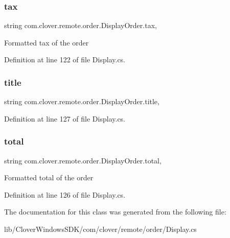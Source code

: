 \subsubsection{\texorpdfstring{tax}{tax}}
{\footnotesize\ttfamily string com.\+clover.\+remote.\+order.\+Display\+Order.\+tax\hspace{0.3cm}{\ttfamily [get]}, {\ttfamily [set]}}

Formatted tax of the order 

Definition at line 122 of file Display.\+cs.

\mbox{\label{classcom_1_1clover_1_1remote_1_1order_1_1_display_order_a05ed411a5be3726312a45e600af9d409}} 
\subsubsection{\texorpdfstring{title}{title}}
{\footnotesize\ttfamily string com.\+clover.\+remote.\+order.\+Display\+Order.\+title\hspace{0.3cm}{\ttfamily [get]}, {\ttfamily [set]}}



Definition at line 127 of file Display.\+cs.

\mbox{\label{classcom_1_1clover_1_1remote_1_1order_1_1_display_order_a776033763dd5b0a0d8ac3b3c67176ac1}} 
\subsubsection{\texorpdfstring{total}{total}}
{\footnotesize\ttfamily string com.\+clover.\+remote.\+order.\+Display\+Order.\+total\hspace{0.3cm}{\ttfamily [get]}, {\ttfamily [set]}}

Formatted total of the order 

Definition at line 126 of file Display.\+cs.



The documentation for this class was generated from the following file\+:\begin{DoxyCompactItemize}
\item 
lib/\+Clover\+Windows\+S\+D\+K/com/clover/remote/order/Display.\+cs\end{DoxyCompactItemize}
